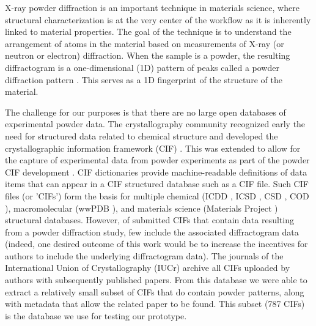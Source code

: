 \documentclass[preprint]{iucr}
\newcommand{\sjb}[1]{\textcolor{blue}{[sjb:#1]}}
\newcommand{\sw}[1]{\textcolor{green}{[sw:#1]}}
\begin{document}
X-ray powder diffraction is an important technique in materials science, where structural characterization is at the very center of the workflow as it is inherently linked to material properties. The goal of the technique is to understand the arrangement of atoms in the material based on measurements of X-ray (or neutron or electron) diffraction.  When the sample is a powder, the resulting diffractogram is a one-dimensional (1D) pattern of peaks called a powder diffraction pattern \cite{gilmoreInternationalTablesCrystallography2019a,dinnebierPowderDiffractionTheory2008c}.
This serves as a 1D fingerprint of the structure of the material.

The challenge for our purposes is that there are no large open databases of experimental powder data.  The crystallography community recognized early the need for structured data related to chemical structure and developed the crystallographic information framework (CIF) \cite{hall;aca91}.  This was extended 
to allow for the capture of experimental data from powder experiments as part of the powder CIF development \cite{hallInternationalTablesCrystallography2006}. CIF dictionaries provide machine-readable definitions of data items that can appear in a CIF structured database such as a CIF file. Such CIF files (or 'CIFs') form the basis for multiple chemical (ICDD \cite{gates-rectorPowderDiffractionFile2019}, ICSD \cite{zagoracRecentDevelopmentsInorganic2019}, CSD \cite{groomCambridgeStructuralDatabase2016}, COD \cite{grazulisCrystallographyOpenDatabase2009d}), macromolecular (wwPDB \cite{bermanProteinDataBank2000}), and materials science (Materials Project \cite{jainCommentaryMaterialsProject2013d}) structural databases. 
However, of submitted CIFs that contain data resulting from a powder diffraction study, few include the associated diffractogram data (indeed, one desired outcome of this work would be to increase the incentives for authors to include the underlying diffractogram data).  The journals of the International Union of Crystallography (IUCr) archive all CIFs uploaded by authors with subsequently published papers. From this database we were able to extract a relatively small subset of CIFs that do contain powder patterns, along with metadata that allow the related paper to be found. This subset (787 CIFs) is the database we use for testing our prototype.
\end{document}
